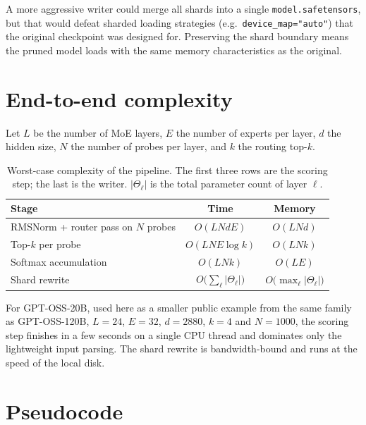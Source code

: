 \documentclass[11pt,a4paper]{article}
\newcommand{\1}{\mathbf{1}}
\theoremstyle{plain}
\begin{document}
A more aggressive writer could merge all shards into a single
\texttt{model.safetensors}, but that would defeat sharded loading
strategies (e.g.\ \texttt{device\_map="auto"}) that the original
checkpoint was designed for.  Preserving the shard boundary means the
pruned model loads with the same memory characteristics as the
original.

\section{End-to-end complexity}

Let $L$ be the number of MoE layers, $E$ the number of experts per
layer, $d$ the hidden size, $N$ the number of probes per layer, and
$k$ the routing top-$k$.

\begin{table}[h]
\centering
\begin{tabular}{lcc}
\toprule
Stage & Time & Memory \\
\midrule
RMSNorm + router pass on $N$ probes &
  $O(L N d E)$ &
  $O(L N d)$ \\
Top-$k$ per probe &
  $O(L N E \log k)$ &
  $O(L N k)$ \\
Softmax accumulation &
  $O(L N k)$ &
  $O(L E)$ \\
Shard rewrite &
  $O\!\bigl(\sum_\ell |\Theta_\ell|\bigr)$ &
  $O\!\bigl(\max_\ell |\Theta_\ell|\bigr)$ \\
\bottomrule
\end{tabular}
\caption{Worst-case complexity of the pipeline.  The first three rows
are the scoring step; the last is the writer.  $|\Theta_\ell|$ is the
total parameter count of layer $\ell$.}
\label{tab:complexity}
\end{table}

For GPT-OSS-20B, used here as a smaller public example from the same
family as GPT-OSS-120B, $L = 24$, $E = 32$, $d = 2880$, $k = 4$ and
$N = 1000$, the scoring step finishes in a few seconds on a single
CPU thread and dominates only the lightweight input parsing.  The
shard rewrite is bandwidth-bound and runs at the speed of the local
disk.

\section{Pseudocode}
\end{document}
